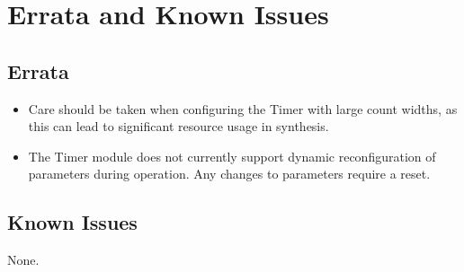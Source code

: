\section{Errata and Known Issues}

\subsection{Errata}
\begin{itemize}
      \item{
            Care should be taken when configuring the Timer with large count widths, as this can lead to significant resource usage in synthesis.
            }
      \item{
            The Timer module does not currently support dynamic reconfiguration of parameters during operation. Any changes to parameters require a reset.
            }
\end{itemize}

\subsection{Known Issues}
None.